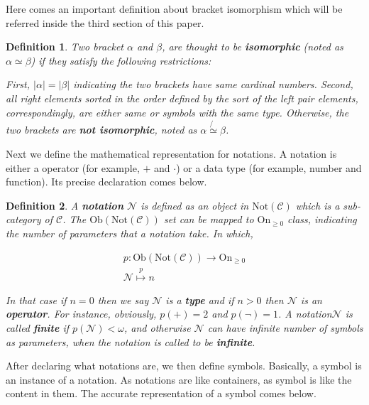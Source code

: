 \documentclass{aims}
\numberwithin{equation}{section}
\newtheorem{definition}{Definition}	%
\numberwithin{theorem}{section}	%
\numberwithin{axiom}{section}	%
\numberwithin{definition}{section}	%
\begin{document}
	Here comes an important definition about bracket isomorphism which will be referred inside the third section of this paper.
	
	\begin{definition}
		Two bracket \(\alpha\) and \(\beta\), are thought to be \textbf{ isomorphic} (noted as \(\alpha \simeq \beta\)) if they satisfy the following restrictions:
		
		First, \(|\alpha |=|\beta |\) indicating the two brackets have same cardinal numbers. Second, all right elements sorted in the order defined by the sort of the left pair elements, correspondingly, are either same or symbols with the same type. Otherwise, the two brackets are \textbf{ not isomorphic}, noted as \(\alpha \not{\simeq}\beta\).
	\end{definition}
	
	Next we define the mathematical representation for notations. A notation is either a operator (for example, \(+\) and \(\cdot\)) or a data type (for example, number and function). Its precise declaration comes below.
	
	\begin{definition}
		A \textbf{ notation} \(\mathcal{N}\) is defined as an object in \(\text{Not}(\mathcal{C})\) which is a sub-category of \(\mathcal{C}\). The \(\text{Ob}(\text{Not}(\mathcal{C}))\) set can be mapped to \(\text{On}_{\geq 0}\) class, indicating the number of parameters that a notation take. In which,
		
		\begin{equation}
			\begin{gathered}
				\mathit{p}:\text{Ob}(\text{Not}(\mathcal{C}))\to \text{On}_{\geq 0}\\
				\mathcal{N}\overset{\mathit{p}}{\mapsto}n
			\end{gathered}
		\end{equation}
		
		In that case if \(n=0\) then we say \(\mathcal{N}\) is a \textbf{ type} and if \(n>0\) then \(\mathcal{N}\) is an \textbf{ operator}. For instance, obviously, \(\mathit{p}(+)=2\) and \(\mathit{p}(\neg )=1\). A notation\(\mathcal{N}\) is called \textbf{ finite} if \(\mathit{p}(\mathcal{N})<\omega\), and otherwise \(\mathcal{N}\) can have infinite number of symbols as parameters, when the notation is called to be \textbf{ infinite}.
	\end{definition}
	
	After declaring what notations are, we then define symbols. Basically, a symbol is an instance of a notation. As notations are like containers, as symbol is like the content in them. The accurate representation of a symbol comes below.
	
\end{document}
